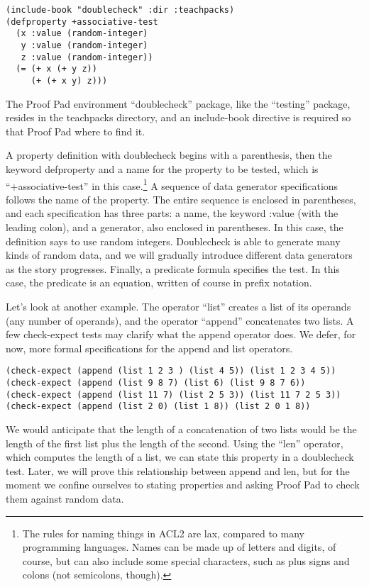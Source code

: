 \begin{Verbatim}
(include-book "doublecheck" :dir :teachpacks)
(defproperty +associative-test
  (x :value (random-integer)
   y :value (random-integer)
   z :value (random-integer))
  (= (+ x (+ y z))
     (+ (+ x y) z)))
\end{Verbatim}

The Proof Pad environment ``doublecheck'' package, 
like the ``testing'' package,
resides in the teachpacks directory,
and an include-book directive is required so that Proof Pad where to find it.

A property definition with doublecheck begins with a parenthesis, then the keyword
defproperty and a name for the property to be tested, 
which is ``+associative-test'' in this case.\footnote{The 
rules for naming things in ACL2 are lax, compared to many 
programming languages. Names can be made up of letters and digits, of course,
but can also include some special characters, 
such as plus signs and colons (not semicolons, though).}
A sequence of data generator specifications follows the name of the property.
The entire sequence is enclosed in parentheses,
and each specification has three parts: a name, the keyword :value (with the leading colon),
and a generator, also enclosed in parentheses.
In this case, the definition says to use random integers. 
Doublecheck is able to generate many kinds of random data,
and we will gradually introduce different data generators as the story progresses.
Finally, a predicate formula specifies the test.
In this case, the predicate is an equation,
written of course in prefix notation.

Let's look at another example.
\label{list-op-informal}
The operator ``list'' creates a list of its operands 
(any number of operands), and
\label{append-op-informal}
the operator ``append'' concatenates two lists. 
A few check-expect tests may clarify what the append operator does.
We defer, for now, more formal specifications for the append and list operators.

\begin{Verbatim}
(check-expect (append (list 1 2 3 ) (list 4 5)) (list 1 2 3 4 5))
(check-expect (append (list 9 8 7) (list 6) (list 9 8 7 6))
(check-expect (append (list 11 7) (list 2 5 3)) (list 11 7 2 5 3))
(check-expect (append (list 2 0) (list 1 8)) (list 2 0 1 8))
\end{Verbatim}

We would anticipate that the length of a concatenation of two lists
would be the length of the first list plus the length of the second.
\label{len-op-informal}
Using the ``len'' operator, which computes the length of a list,
we can state this property in a doublecheck test.
Later, we will prove this relationship between append and len,
but for the moment we confine ourselves to stating properties 
and asking Proof Pad to check them against random data.

